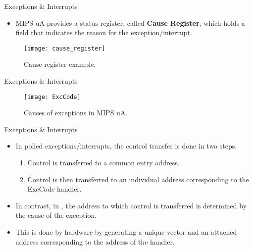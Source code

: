 % 
\begin{frame}{Exceptions \& Interrupts}{}
\begin{itemize}
\item \ac{MIPS} \ac{uA} provides a status register, called \textbf{Cause Register}, which holds a field that indicates the reason for the exception/interrupt.
\end{itemize}
\begin{figure}
\centering
\texttt{[image: cause\_register]}
\caption{Cause register example.}
\label{Figure:CauseRegister}
\end{figure}
\end{frame}

% 
\begin{frame}{Exceptions \& Interrupts}{}
\begin{figure}
\centering
\texttt{[image: ExcCode]}
\vspace{-10pt}
\caption{Causes of exceptions in \ac{MIPS} \ac{uA}.}
\label{Figure:ExcCode}
\end{figure}
\end{frame}

% 
\begin{frame}{Exceptions \& Interrupts}{}
\begin{itemize}
\item In polled exceptions/interrupts, the control transfer is done in two steps.
\begin{enumerate}
\item Control is transferred to a common entry address.
\item Control is then transferred to an individual address corresponding to the ExcCode handler.
\end{enumerate}
\item In contrast, in , the address to which control is transferred is determined by the cause of the exception.
\item This is done by hardware by generating a unique vector and an attached address corresponding to the address of the handler.
\end{itemize}
\end{frame}


